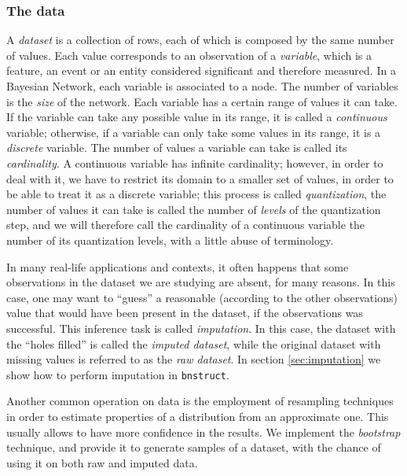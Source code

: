 \documentclass{article}\usepackage[]{graphicx}\usepackage[]{color}
\newcommand{\Rpackage}[1]{{\texttt{#1}}}
\begin{document}
\subsubsection{The data}
A \emph{dataset} is a collection of rows, each of which is composed by the same number
of values. Each value corresponds to an observation of a \emph{variable}, which is a feature,
an event or an entity considered significant and therefore measured. In a Bayesian Network,
each variable is associated to a node. The number of variables is the \emph{size} of the
network. Each variable has a certain range of values it can take. If the variable can take
any possible value in its range, it is called a \emph{continuous} variable; otherwise,
if a variable can only take some values in its range, it is a \emph{discrete} variable.
The number of values a variable can take is called its \emph{cardinality}.
A continuous variable has infinite cardinality; however, in order to deal with it,
we have to restrict its domain to a smaller set of values, in order to be able to
treat it as a discrete variable; this process is called \emph{quantization}, the
number of values it can take is called the number of \emph{levels} of the quantization step,
and we will therefore call the cardinality of a continuous variable the number of its
quantization levels, with a little abuse of terminology.

In many real-life applications and contexts, it often happens that some observations in
the dataset we are studying are absent, for many reasons. In this case, one may want to
``guess'' a reasonable (according to the other observations) value that would have been
present in the dataset, if the observations was successful. This inference task is
called \emph{imputation}. In this case, the dataset with the ``holes filled''
is called the \emph{imputed dataset}, while the original dataset with missing values is
referred to as the \emph{raw dataset}.
In section \ref{sec:imputation} we show how to perform imputation in \Rpackage{bnstruct}.

Another common operation on data is the employment of resampling techniques in order
to estimate properties of a distribution from an approximate one. This usually allows
to have more confidence in the results. We implement the \emph{bootstrap} technique,
and provide it to generate samples of a dataset, with the chance of using it on both raw and imputed data.
\end{document}
